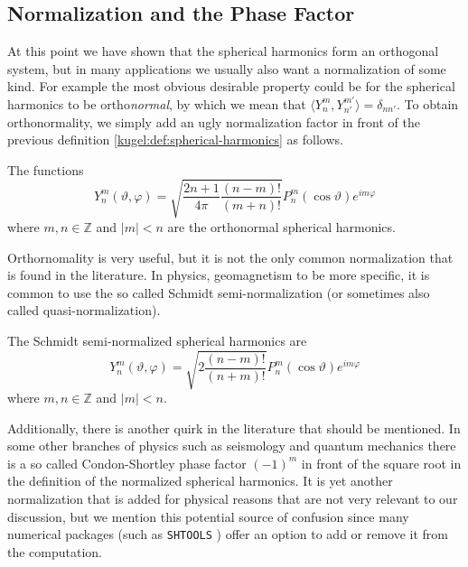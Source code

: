 \subsection{Normalization and the Phase Factor}

At this point we have shown that the spherical harmonics form an orthogonal
system, but in many applications we usually also want a normalization of some
kind. For example the most obvious desirable property could be for the spherical
harmonics to be ortho\emph{normal}, by which we mean that $\langle Y^m_n,
Y^{m'}_{n'} \rangle = \delta_{nn'}$. To obtain orthonormality, we simply add an
ugly normalization factor in front of the previous definition
\ref{kugel:def:spherical-harmonics} as follows.

\begin{definition}
  \label{kugel:def:spherical-harmonics-orthonormal}
  The functions
  \begin{equation*}
    Y^m_n(\vartheta, \varphi)
    = \sqrt{\frac{2n + 1}{4\pi} \frac{(n-m)!}{(m+n)!}}
      P^m_n(\cos \vartheta) e^{im\varphi}
  \end{equation*}
  where $m, n \in \mathbb{Z}$ and $|m| < n$ are the orthonormal spherical
  harmonics.
\end{definition}

Orthornomality is very useful, but it is not the only common normalization that
is found in the literature. In physics, geomagnetism to be more specific, it is
common to use the so called Schmidt semi-normalization (or sometimes also called
quasi-normalization).

\begin{definition}
  \label{kugel:def:spherical-harmonics-schmidt}
  The Schmidt semi-normalized spherical harmonics are
  \begin{equation*}
    Y^m_n(\vartheta, \varphi)
    = \sqrt{2 \frac{(n - m)!}{(n + m)!}}
      P^m_n(\cos \vartheta) e^{im\varphi}
  \end{equation*}
  where $m, n \in \mathbb{Z}$ and $|m| < n$.
\end{definition}

Additionally, there is another quirk in the literature that should be mentioned.
In some other branches of physics such as seismology and quantum mechanics there
is a so called Condon-Shortley phase factor $(-1)^m$ in front of the square root
in the definition of the normalized spherical harmonics. It is yet another
normalization that is added for physical reasons that are not very relevant to
our discussion, but we mention this potential source of confusion since many
numerical packages (such as \texttt{SHTOOLS} ) offer an
option to add or remove it from the computation.

